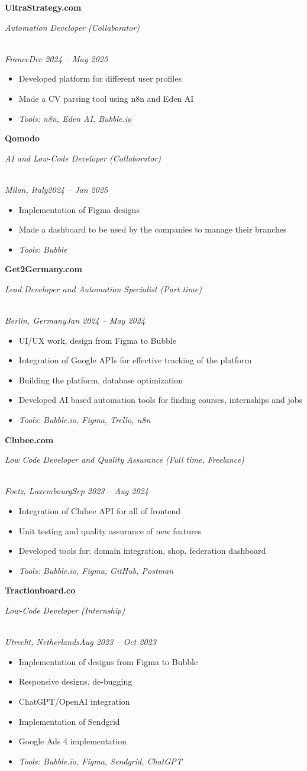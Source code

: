 \documentclass[a4paper,10pt]{article}
\newcommand{\role}[4]{\vspace{3pt}\noindent\hspace{0.6em}\parbox[t]{0.38\textwidth}{\raggedright\textbf{#1}}\hfill\parbox[t]{0.58\textwidth}{\raggedleft\textit{#2}}\\{\textit{#3}\hfill\textit{#4}}\vspace{1pt}}
\begin{document}
\role{UltraStrategy.com}{Automation Developer (Collaborator)}{France}{Dec 2024 -- May 2025}
\begin{itemize}
\item Developed platform for different user profiles
\item Made a CV parsing tool using n8n and Eden AI
\item \textit{Tools: n8n, Eden AI, Bubble.io}
\end{itemize}

\role{Qomodo}{AI and Low-Code Developer (Collaborator)}{Milan, Italy}{2024 -- Jan 2025}
\begin{itemize}
\item Implementation of Figma designs
\item Made a dashboard to be used by the companies to manage their branches
\item \textit{Tools: Bubble}
\end{itemize}

\role{Get2Germany.com}{Lead Developer and Automation Specialist (Part time)}{Berlin, Germany}{Jan 2024 -- May 2024}
\begin{itemize}
\item UI/UX work, design from Figma to Bubble
\item Integration of Google APIs for effective tracking of the platform
\item Building the platform, database optimization
\item Developed AI based automation tools for finding courses, internships and jobs
\item \textit{Tools: Bubble.io, Figma, Trello, n8n}
\end{itemize}

\role{Clubee.com}{Low Code Developer and Quality Assurance (Full time, Freelance)}{Foetz, Luxembourg}{Sep 2023 -- Aug 2024}
\begin{itemize}
\item Integration of Clubee API for all of frontend
\item Unit testing and quality assurance of new features
\item Developed tools for: domain integration, shop, federation dashboard
\item \textit{Tools: Bubble.io, Figma, GitHub, Postman}
\end{itemize}

\role{Tractionboard.co}{Low-Code Developer (Internship)}{Utrecht, Netherlands}{Aug 2023 -- Oct 2023}
\begin{itemize}
\item Implementation of designs from Figma to Bubble
\item Responsive designs, de-bugging
\item ChatGPT/OpenAI integration
\item Implementation of Sendgrid
\item Google Ads 4 implementation
\item \textit{Tools: Bubble.io, Figma, Sendgrid, ChatGPT}
\end{itemize}
\end{document}
